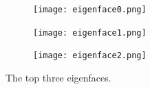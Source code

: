 \begin{figure}
\begin{subfigure}[b]{0.3\textwidth}
\texttt{[image: eigenface0.png]}
\end{subfigure}
\begin{subfigure}[b]{0.3\textwidth}
\texttt{[image: eigenface1.png]}
\end{subfigure}
\begin{subfigure}[b]{0.3\textwidth}
\texttt{[image: eigenface2.png]}
\end{subfigure}
\caption{The top three eigenfaces.}
\label{facialRecognition:eigenfaces}
\end{figure}


